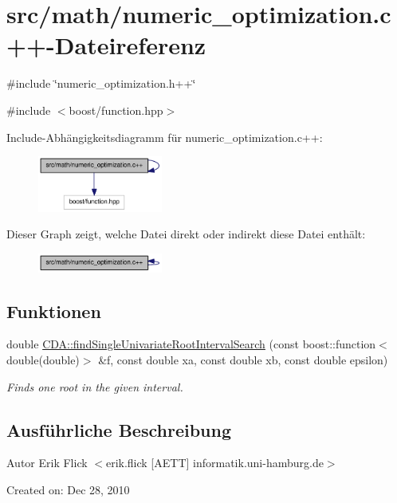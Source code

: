 \hypertarget{numeric__optimization_8c_09_09}{
\section{src/math/numeric\_\-optimization.c++-\/Dateireferenz}
\label{numeric__optimization_8c_09_09}
}
{\ttfamily \#include \char`\"{}numeric\_\-optimization.h++\char`\"{}}\par
{\ttfamily \#include $<$boost/function.hpp$>$}\par
Include-\/Abhängigkeitsdiagramm für numeric\_\-optimization.c++:\nopagebreak
\begin{figure}[H]
\begin{center}
\leavevmode
\includegraphics[width=116pt]{numeric__optimization_8c_09_09__incl}
\end{center}
\end{figure}
Dieser Graph zeigt, welche Datei direkt oder indirekt diese Datei enthält:\nopagebreak
\begin{figure}[H]
\begin{center}
\leavevmode
\includegraphics[width=116pt]{numeric__optimization_8c_09_09__dep__incl}
\end{center}
\end{figure}
\subsection*{Funktionen}
\begin{DoxyCompactItemize}
\item 
double \hyperlink{namespaceCDA_ab4d6ad3bb6730a396ee12d33fe5ad7ca}{CDA::findSingleUnivariateRootIntervalSearch} (const boost::function$<$ double(double)$>$ \&f, const double xa, const double xb, const double epsilon)
\begin{DoxyCompactList}\small\item\em Finds one root in the given interval. \item\end{DoxyCompactList}\end{DoxyCompactItemize}


\subsection{Ausführliche Beschreibung}
\begin{DoxyAuthor}{Autor}
Erik Flick $<$erik.flick \mbox{[}AETT\mbox{]} informatik.uni-\/hamburg.de$>$
\end{DoxyAuthor}
Created on: Dec 28, 2010 